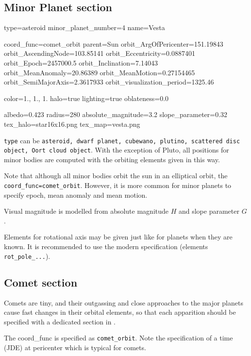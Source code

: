 \subsection{Minor Planet section}
\label{sec:ssystem.ini:MinorPlanet}

\begin{configfile}
[4vesta]
type=asteroid  
minor_planet_number=4
name=Vesta

coord_func=comet_orbit
parent=Sun
orbit_ArgOfPericenter=151.19843
orbit_AscendingNode=103.85141
orbit_Eccentricity=0.0887401
orbit_Epoch=2457000.5
orbit_Inclination=7.14043
orbit_MeanAnomaly=20.86389
orbit_MeanMotion=0.27154465
orbit_SemiMajorAxis=2.3617933
orbit_visualization_period=1325.46

color=1., 1., 1.
halo=true
lighting=true
oblateness=0.0

albedo=0.423
radius=280
absolute_magnitude=3.2
slope_parameter=0.32
tex_halo=star16x16.png
tex_map=vesta.png
\end{configfile}

\texttt{type} can be \texttt{asteroid, dwarf planet, cubewano,
  plutino, scattered disc object, Oort cloud object}. With the
exception of Pluto, all positions for minor bodies are computed with
the orbiting elements given in this way. 

Note that although all minor bodies orbit the sun in an
elliptical orbit, the \texttt{coord\_func=comet\_orbit}. However, it
is more common for minor planets to specify epoch, mean anomaly and
mean motion.

Visual magnitude is modelled from absolute magnitude $H$ and slope parameter $G$.

Elements for rotational axis may be given just like for planets when
they are known. It is recommended to use the modern specification
(elements \texttt{rot\_pole\_...}).

\subsection{Comet section}
\label{sec:ssystem.ini:Comet}

Comets are tiny, and their outgassing and close approaches to the
major planets cause fast changes in their orbital elements, so that
each apparition should be specified with a dedicated section in
. 

The coord\_func is specified as \texttt{comet\_orbit}.  Note the
specification of a time (JDE) at pericenter which is typical for
comets.

